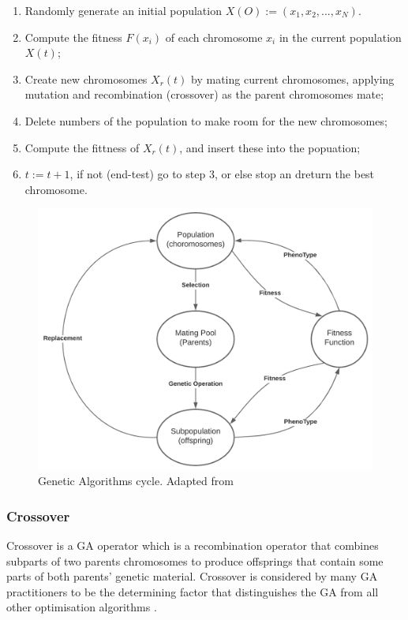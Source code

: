 \documentclass[a4paper, 11pt]{article}
\begin{document}
    \begin{enumerate}
       \item Randomly generate an initial population $X(O):= (x_{1}, x_{2}, ..., x_{N})$.
       \item Compute the fitness $F(x_{i})$ of each chromosome $x_{i}$ in the  current population $X(t)$;
       \item Create new chromosomes $X_{r}(t)$ by mating current chromosomes, applying mutation and recombination (crossover) as the 
       parent chromosomes mate;
       \item Delete numbers of the population  to make room for the new chromosomes;
       \item Compute the fittness of $X_{r}(t)$, and insert these into the popuation;
       \item $t:= t + 1$, if not (end-test) go to step 3, or else stop an dreturn the best chromosome.
   \end{enumerate}

        \begin{figure}[h!]
            \centering
            \graphicspath{{./wiki/}}
            \includegraphics[scale=0.8]{GA_cycle.png}
            \caption{Genetic Algorithms cycle. Adapted from \cite{Tang1996}}
            \label{Fig:GA_cycle}
        \end{figure}

        \subsubsection{Crossover}
            Crossover is a GA operator which is a recombination operator that combines subparts of two parents 
            chromosomes to produce offsprings that contain some parts of both parents' genetic material. Crossover
            is considered by many GA practitioners to be the determining factor that distinguishes the GA from
            all other optimisation algorithms \cite{Tang1996}.
\end{document}
